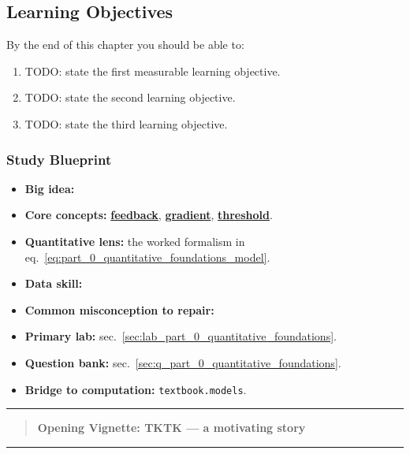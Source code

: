 \documentclass[
]{article}
\providecommand{\tightlist}{%
  \setlength{\itemsep}{0pt}\setlength{\parskip}{0pt}}
\theoremstyle{plain}
\theoremstyle{definition}
\begin{document}
\subsection{Learning Objectives}\label{learning-objectives-2}

By the end of this chapter you should be able to:

\begin{enumerate}
\def\labelenumi{\arabic{enumi}.}
\item
  TODO: state the first measurable learning objective.
\item
  TODO: state the second learning objective.
\item
  TODO: state the third learning objective.
\end{enumerate}

\subsubsection{Study Blueprint}\label{study-blueprint-2}

\begin{itemize}
\tightlist
\item
  \textbf{Big idea:}
\item
  \textbf{Core concepts:} \hyperref[gl:feedback]{\textbf{feedback}},
  \hyperref[gl:gradient]{\textbf{gradient}},
  \hyperref[gl:threshold]{\textbf{threshold}}.
\item
  \textbf{Quantitative lens:} the worked formalism in
  eq.~\ref{eq:part_0_quantitative_foundations_model}.
\item
  \textbf{Data skill:}
\item
  \textbf{Common misconception to repair:}
\item
  \textbf{Primary lab:}
  sec.~\ref{sec:lab_part_0_quantitative_foundations}.
\item
  \textbf{Question bank:}
  sec.~\ref{sec:q_part_0_quantitative_foundations}.
\item
  \textbf{Bridge to computation:} \texttt{textbook.models}.
\end{itemize}

\begin{center}\rule{0.5\linewidth}{0.5pt}\end{center}

\begin{quote}
\textbf{Opening Vignette: TKTK --- a motivating story}
\end{quote}

\begin{center}\rule{0.5\linewidth}{0.5pt}\end{center}
\end{document}
